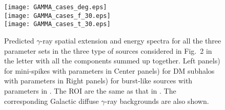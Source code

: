 \begin{figure}[!htbp]
\begin{center}
\texttt{[image: GAMMA\_cases\_deg.eps]}
\\
\texttt{[image: GAMMA\_cases\_f\_30.eps]}
\\
\texttt{[image: GAMMA\_cases\_t\_30.eps]}
\caption{
Predicted $\gamma$-ray spatial extension and energy spectra 
for all the three parameter sets in the three type of sources considered in 
Fig.~2 %
in the letter with all the components summed up together.
Left panels) for mini-spikes with parameters in 
Center panels) for DM subhalos with parameters in 
Right panels) for burst-like sources with parameters in .
The ROI are the same as that in .
The corresponding Galactic diffuse $\gamma$-ray backgrounds are also shown.
}
\label{fig:GAMMA_cases_30}
\end{center}
\end{figure}


